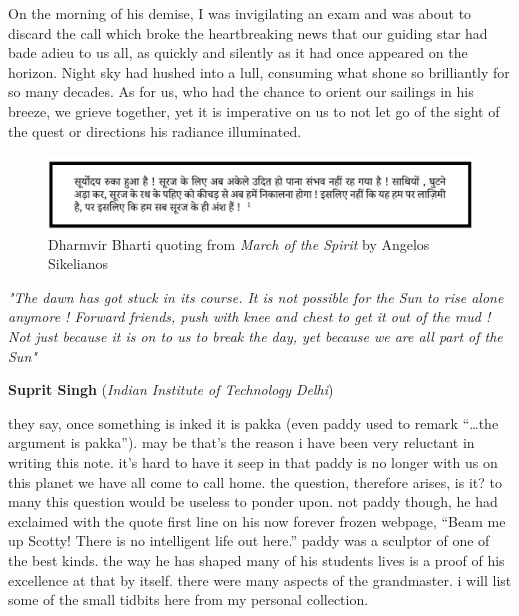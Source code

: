 \documentclass[prd, preprint, longbibliography, 12pt]{revtex4-2}
\begin{document}
On the morning of his demise, I was invigilating an exam and was about to discard the call which broke the heartbreaking  news that our guiding star had bade adieu to us all, as quickly and silently as it had once appeared on the horizon. Night sky had hushed into a lull, consuming what shone so brilliantly for so many decades. As for us, who had the chance to orient our sailings in his breeze, we grieve together, yet it is imperative on us to not let go of the sight of the quest or directions his radiance illuminated.

\begin{figure}[!h]
\centering
\includegraphics[width=12.00cm]{sanskrit2.png}
\caption*{Dharmvir Bharti 
quoting from \textit{March of the Spirit} by Angelos Sikelianos}
\end{figure}

\noindent \textit{"The dawn has got stuck in its course. It is not possible for the Sun to rise alone anymore ! 
 Forward friends, push with knee and chest to get it out of the mud !
 Not just because it is on to us to break the day, yet because we are all part of the Sun"}
 
\bigskip

\bigskip

\bigskip

\centerline{{\bf Suprit Singh} ({\it Indian Institute of Technology Delhi})}
\medskip
{}

\noindent they say, once something is inked it is pakka (even paddy used to remark “…the argument is pakka”). may be that’s the reason i have been very reluctant in writing this note. it’s hard to have it seep in that paddy is no longer with us on this planet we have all come to call home. the question, therefore arises, is it? to many this question would be useless to ponder upon. not paddy though, he had exclaimed with the quote first line on his now forever frozen webpage, “Beam me up Scotty! There is no intelligent life out here.”  paddy was a sculptor of one of the best kinds. the way he has shaped many of his students lives is a proof of his excellence at that by itself.  there were many aspects of the grandmaster. i will list some of the small tidbits here from my personal collection. 
\end{document}
